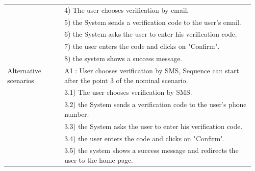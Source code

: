 \documentclass[]{uc2pfecaneva}
\begin{document}
\begin{table}[h]
\begin{tabularx}{\textwidth}{|l|X|}
		                      & 4) The user chooses verification by email.                                                                                                                           \\
		                      & 5) the System sends a verification code to the user's email.                                                                                                         \\
		                      & 6) the System asks the user to enter his verification code.                                                                                                          \\
		                      & 7) the user enters the code and clicks on "Confirm".                                                                                                                 \\
		                      & 8) the system shows a success message.                                                                                                                               \\ \hline
		Alternative scenarios
		                      & A1 : User chooses verification by SMS,  Sequence can start after the point 3 of the nominal scenario.                                                                \\
		                      & \hspace{4mm}3.1) The user chooses verification by SMS.                                                                                                               \\
		                      & \hspace{4mm}3.2) the System sends a verification code to the user's phone number.                                                                                    \\
		                      & \hspace{4mm}3.3) the System asks the user to enter his verification code.                                                                                            \\
		                      & \hspace{4mm}3.4) the user enters the code and clicks on "Confirm".                                                                                                   \\
		                      & \hspace{4mm}3.5) the system shows a success message and redirects the user to the home page.                                                                         \\ \hline

\end{tabularx}
\end{table}
\end{document}
